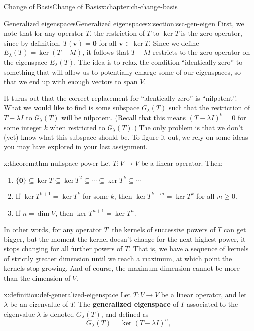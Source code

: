 \documentclass[oneside,10pt,]{book}
\newcommand{\terminology}[1]{\textbf{#1}}
\numberwithin{equation}{section}
\newcommand{\vv}{\mathbf{v}}
\newcommand{\zer}{\mathbf{0}}
\begin{document}
\begin{chapterptx}{Change of Basis}{}{Change of Basis}{}{}{x:chapter:ch-change-basis}
\begin{sectionptx}{Generalized eigenspaces}{}{Generalized eigenspaces}{}{}{x:section:sec-gen-eigen}
First, we note that for any operator \(T\), the restriction of \(T\) to \(\ker T\) is the zero operator, since by definition, \(T(\vv)=\zer\) for all \(\vv\in\ker T\). Since we define \(E_{\lambda}(T)=\ker (T-\lambda I)\), it follows that \(T-\lambda I\) restricts to the zero operator on the eigenspace \(E_\lambda(T)\). The idea is to relax the condition ``identically zero'' to something that will allow us to potentially enlarge some of our eigenspaces, so that we end up with enough vectors to span \(V\).%
\par
It turns out that the correct replacement for ``identically zero'' is ``nilpotent''. What we would like to find is some subspace \(G_\lambda(T)\) such that the restriction of \(T-\lambda I\) to \(G_\lambda(T)\) will be nilpotent. (Recall that this means \((T-\lambda I)^k = 0\) for some integer \(k\) when restricted to \(G_\lambda(T)\).) The only problem is that we don't (yet) know what this subspace should be. To figure it out, we rely on some ideas you may have explored in your last assignment.%
\begin{theorem}{}{}{x:theorem:thm-nullspace-power}%
Let \(T:V\to V\) be a linear operator. Then:%
\begin{enumerate}
\item{}\(\displaystyle \{\zer\}\subseteq \ker T \subseteq \ker T^2 \subseteq \cdots \subseteq \ker T^k\subseteq \cdots\)%
\item{}If \(\ker T^{k+1}=\ker T^k\) for some \(k\), then \(\ker T^{k+m}=\ker T^k\) for all \(m\geq 0\).%
\item{}If \(n=\dim V\), then \(\ker T^{n+1} = \ker T^n\).%
\end{enumerate}
%
\end{theorem}
In other words, for any operator \(T\), the kernels of successive powers of \(T\) can get bigger, but the moment the kernel doesn't change for the next highest power, it stops changing for all further powers of \(T\). That is, we have a sequence of kernels of strictly greater dimension until we reach a maximum, at which point the kernels stop growing. And of course, the maximum dimension cannot be more than the dimension of \(V\).%
\begin{definition}{}{x:definition:def-generalized-eigenspace}%
Let \(T:V\to V\) be a linear operator, and let \(\lambda\) be an eigenvalue of \(T\). The \terminology{generalized eigenspace} of \(T\) associated to the eigenvalue \(\lambda\) is denoted \(G_\lambda(T)\), and defined as%
\begin{equation*}
G_\lambda(T) = \ker (T-\lambda I)^n\text{,}

\end{equation*}
\end{definition}
\end{sectionptx}
\end{chapterptx}
\end{document}
